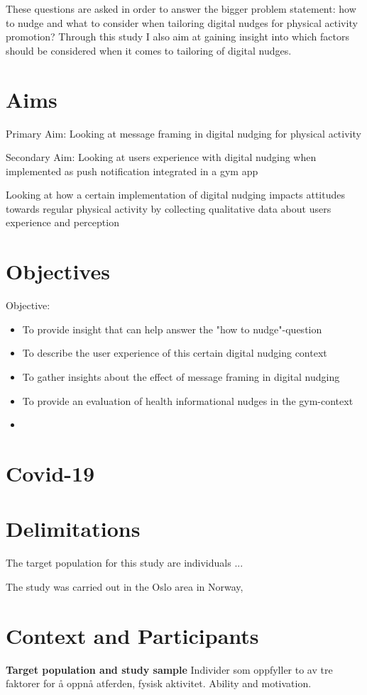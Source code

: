 These questions are asked in order to answer the bigger problem statement: how to nudge and what to consider when tailoring digital nudges for physical activity promotion? Through this study I also aim at gaining insight into which factors should be considered when it comes to tailoring of digital nudges. 

\section{Aims}
Primary Aim: Looking at message framing in digital nudging for physical activity

Secondary Aim: Looking at users experience with digital nudging when implemented as push notification integrated in a gym app 

Looking at how a certain implementation of digital nudging impacts attitudes towards regular physical activity by collecting qualitative data about users experience and perception 


\section{Objectives}
Objective: 
\begin{itemize}
\item To provide insight that can help answer the "how to nudge"-question 
\item To describe the user experience of this certain digital nudging context 
\item To gather insights about the effect of message framing in digital nudging 
\item To provide an evaluation of health informational nudges in the gym-context
\item 
\end{itemize}

\section{Covid-19}

\section{Delimitations}
The target population for this study are individuals ... 

The study was carried out in the Oslo area in Norway, 

\section{Context and Participants}
\textbf{    Target population and study sample}
Individer som oppfyller to av tre faktorer for å oppnå atferden, fysisk aktivitet. Ability and motivation. 

